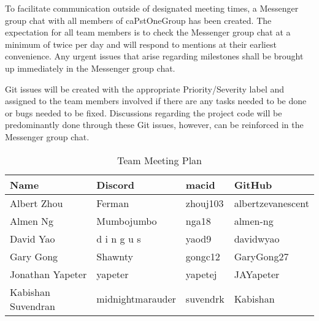 \documentclass[12pt,letterpaper]{article}
\begin{document}
To facilitate communication outside of designated meeting times, a Messenger
group chat with all members of caPstOneGroup has been created. The expectation
for all team members is to check the Messenger group chat at a minimum of twice
per day and will respond to mentions at their earliest convenience. Any urgent
issues that arise regarding milestones shall be brought up immediately in the
Messenger group chat. 

Git issues will be created with the appropriate Priority/Severity label and
assigned to the team members involved if there are any tasks needed to be done
or bugs needed to be fixed. Discussions regarding the project code will be
predominantly done through these Git issues, however, can be reinforced in the
Messenger group chat.

\begin{table}[hp]
\begin{tabularx}{\textwidth}{|l|X|X|X|}
\toprule
\textbf{Name} & \textbf{Discord} & \textbf{macid} & \textbf{GitHub}\\
\midrule
Albert Zhou & Ferman & zhouj103 & albertzevanescent\\
Almen Ng & Mumbojumbo & nga18 & almen-ng\\
David Yao & d i n g u s & yaod9 & davidwyao\\
Gary Gong & Shawnty & gongc12 & GaryGong27\\
Jonathan Yapeter & yapeter & yapetej & JAYapeter\\
Kabishan Suvendran & midnightmarauder & suvendrk & Kabishan\\
\bottomrule
\end{tabularx}
\caption{Team Meeting Plan} \label{tab:teamMeetingPlan}
\end{table}

\end{document}
